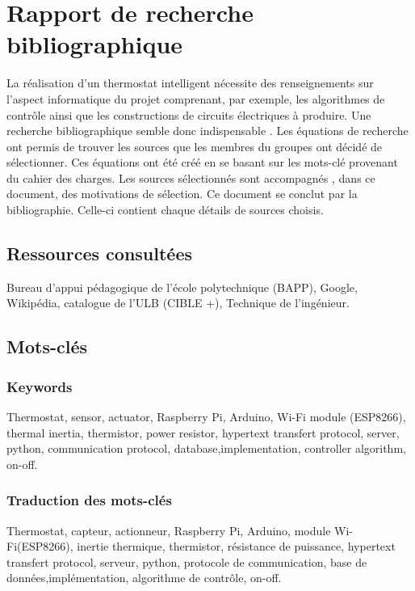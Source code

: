 \documentclass[12pt]{report}
\begin{document}



\appendix

\chapter{Rapport de recherche bibliographique}

La r\'{e}alisation d'un thermostat intelligent nécessite des renseignements sur l'aspect informatique du projet comprenant, par exemple, les algorithmes de contr\^{o}le ainsi que les constructions de circuits \'{e}lectriques \`{a} produire.
\newline
Une recherche bibliographique semble donc indispensable . Les \'{e}quations de recherche ont permis de trouver les sources que les membres du groupes ont d\'{e}cid\'{e} de s\'{e}lectionner. Ces \'{e}quations ont \'{e}t\'{e} cr\'{e}\'{e} en se basant sur les mots-cl\'{e} provenant du cahier des charges. Les sources s\'{e}lectionn\'{e}s sont accompagn\'{e}s , dans ce document, des motivations de s\'{e}lection. Ce document se conclut par la bibliographie. Celle-ci contient chaque d\'{e}tails de sources choisis.  
\section{Ressources consult\'{e}es}
Bureau d'appui p\'{e}dagogique de l'\'{e}cole polytechnique (BAPP),
Google, Wikip\'{e}dia, catalogue de l'ULB (CIBLE +), Technique de l'ing\'{e}nieur.
\section{Mots-cl\'{e}s}

\subsection{Keywords}
Thermostat, sensor, actuator, Raspberry Pi, Arduino, Wi-Fi module (ESP8266), thermal inertia,  thermistor, power resistor, hypertext transfert protocol, server, python, communication protocol, database,implementation, controller algorithm, on-off.

\subsection{Traduction des mots-cl\'{e}s}
Thermostat, capteur, actionneur, Raspberry Pi, Arduino, module Wi-Fi(ESP8266), inertie
thermique, thermistor, r\'{e}sistance de puissance, hypertext transfert protocol, serveur, python, protocole de communication, base de donn\'{e}es,impl\'{e}mentation, algorithme de contr\^{o}le, on-off.
\end{document}
